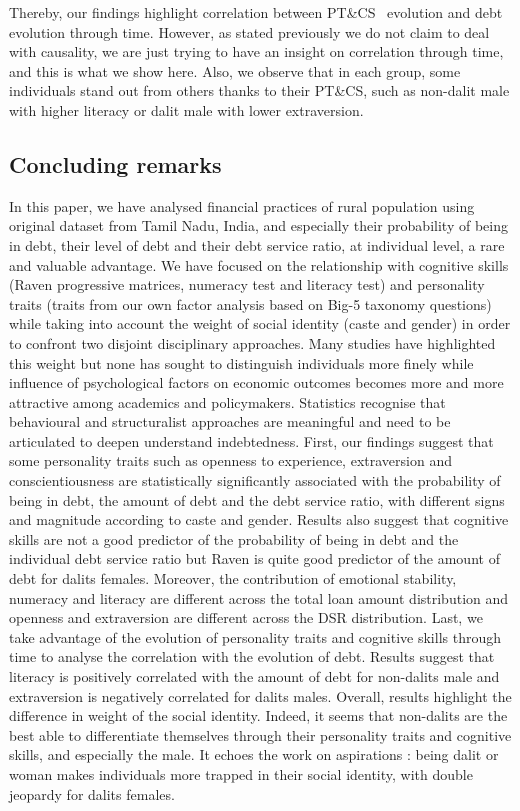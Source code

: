 \documentclass[a4paper, 11pt, onecolumn]{article}
\newcommand{\PTCS}{PT\&CS}
\begin{document}
Thereby, our findings highlight correlation between \PTCS~ evolution and debt evolution through time.
However, as stated previously we do not claim to deal with causality, we are just trying to have an insight on correlation through time, and this is what we show here.
Also, we observe that in each group, some individuals stand out from others thanks to their \PTCS, such as non-dalit male with higher literacy or dalit male with lower extraversion.



	\subsection{Concluding remarks}

In this paper, we have analysed financial practices of rural population using original dataset from Tamil Nadu, India, and especially their probability of being in debt, their level of debt and their debt service ratio, at individual level, a rare and valuable advantage.
We have focused on the relationship with cognitive skills (Raven progressive matrices, numeracy test and literacy test) and personality traits (traits from our own factor analysis based on Big-5 taxonomy questions) while taking into account the weight of social identity (caste and gender) in order to confront two disjoint disciplinary approaches.
Many studies have highlighted this weight but none has sought to distinguish individuals more finely while influence of psychological factors on economic outcomes becomes more and more attractive among academics and policymakers.
Statistics recognise that behavioural and structuralist approaches are meaningful and need to be articulated to deepen understand indebtedness.
First, our findings suggest that some personality traits such as openness to experience, extraversion and conscientiousness are statistically significantly associated with the probability of being in debt, the amount of debt and the debt service ratio, with different signs and magnitude according to caste and gender. 
Results also suggest that cognitive skills are not a good predictor of the probability of being in debt and the individual debt service ratio but Raven is quite good predictor of the amount of debt for dalits females.
Moreover, the contribution of emotional stability, numeracy and literacy are different across the total loan amount distribution and openness and extraversion are different across the DSR distribution.
Last, we take advantage of the evolution of personality traits and cognitive skills through time to analyse the correlation with the evolution of debt.
Results suggest that literacy is positively correlated with the amount of debt for non-dalits male and extraversion is negatively correlated for dalits males.
Overall, results highlight the difference in weight of the social identity.
Indeed, it seems that non-dalits are the best able to differentiate themselves through their personality traits and cognitive skills, and especially the male.
It echoes the work on aspirations \citep{Mukherjee2017, Sarkar2020}: being dalit or woman makes individuals more trapped in their social identity, with double jeopardy for dalits females.
\end{document}
